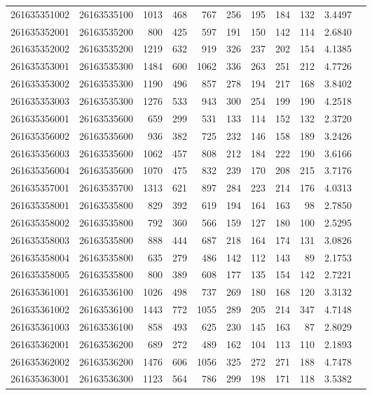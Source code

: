 \documentclass[11pt,landscape]{article}
\begin{document}
{\begin{longtable}[]{@{}lrrrrrrrrrr@{}}
261635351002 & 26163535100 & 1013 & 468 & 767 & 256 & 195 & 184 & 132 & 3.4497 \\
261635352001 & 26163535200 & 800 & 425 & 597 & 191 & 150 & 142 & 114 & 2.6840 \\
261635352002 & 26163535200 & 1219 & 632 & 919 & 326 & 237 & 202 & 154 & 4.1385 \\
261635353001 & 26163535300 & 1484 & 600 & 1062 & 336 & 263 & 251 & 212 & 4.7726 \\
261635353002 & 26163535300 & 1190 & 496 & 857 & 278 & 194 & 217 & 168 & 3.8402 \\
261635353003 & 26163535300 & 1276 & 533 & 943 & 300 & 254 & 199 & 190 & 4.2518 \\
261635356001 & 26163535600 & 659 & 299 & 531 & 133 & 114 & 152 & 132 & 2.3720 \\
261635356002 & 26163535600 & 936 & 382 & 725 & 232 & 146 & 158 & 189 & 3.2426 \\
261635356003 & 26163535600 & 1062 & 457 & 808 & 212 & 184 & 222 & 190 & 3.6166 \\
261635356004 & 26163535600 & 1070 & 475 & 832 & 239 & 170 & 208 & 215 & 3.7176 \\
261635357001 & 26163535700 & 1313 & 621 & 897 & 284 & 223 & 214 & 176 & 4.0313 \\
261635358001 & 26163535800 & 829 & 392 & 619 & 194 & 164 & 163 & 98 & 2.7850 \\
261635358002 & 26163535800 & 792 & 360 & 566 & 159 & 127 & 180 & 100 & 2.5295 \\
261635358003 & 26163535800 & 888 & 444 & 687 & 218 & 164 & 174 & 131 & 3.0826 \\
261635358004 & 26163535800 & 635 & 279 & 486 & 142 & 112 & 143 & 89 & 2.1753 \\
261635358005 & 26163535800 & 800 & 389 & 608 & 177 & 135 & 154 & 142 & 2.7221 \\
261635361001 & 26163536100 & 1026 & 498 & 737 & 269 & 180 & 168 & 120 & 3.3132 \\
261635361002 & 26163536100 & 1443 & 772 & 1055 & 289 & 205 & 214 & 347 & 4.7148 \\
261635361003 & 26163536100 & 858 & 493 & 625 & 230 & 145 & 163 & 87 & 2.8029 \\
261635362001 & 26163536200 & 689 & 272 & 489 & 162 & 104 & 113 & 110 & 2.1893 \\
261635362002 & 26163536200 & 1476 & 606 & 1056 & 325 & 272 & 271 & 188 & 4.7478 \\
261635363001 & 26163536300 & 1123 & 564 & 786 & 299 & 198 & 171 & 118 & 3.5382 \\

\end{longtable}}
\end{document}
